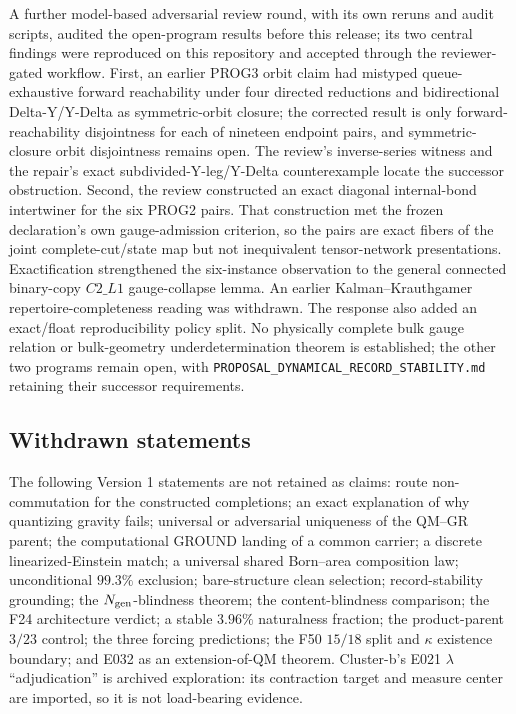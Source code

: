 A further model-based adversarial review round, with its own reruns and audit scripts, audited the open-program results
before this release; its two central findings were reproduced on this repository and accepted through the
reviewer-gated workflow. First, an earlier PROG3 orbit claim had mistyped queue-exhaustive forward reachability under
four directed reductions and bidirectional Delta-Y/Y-Delta as symmetric-orbit closure; the corrected result is only
forward-reachability disjointness for each of nineteen endpoint pairs, and symmetric-closure orbit disjointness remains
open. The review's inverse-series witness and the repair's exact subdivided-Y-leg/Y-Delta counterexample locate the
successor obstruction. Second, the review constructed an exact diagonal internal-bond intertwiner for the six PROG2
pairs. That construction met the frozen declaration's own gauge-admission criterion, so the pairs are exact fibers of the
joint complete-cut/state map but not inequivalent tensor-network presentations. Exactification strengthened the
six-instance observation to the general connected binary-copy \(C2\_L1\) gauge-collapse lemma. An earlier
Kalman--Krauthgamer repertoire-completeness reading was withdrawn. The response also added an exact/float
reproducibility policy split. No physically complete bulk gauge relation or bulk-geometry
underdetermination theorem is established; the other two programs remain open, with
\nolinkurl{PROPOSAL_DYNAMICAL_RECORD_STABILITY.md} retaining their successor requirements.

\subsection{Withdrawn statements}

The following Version 1 statements are not retained as claims: route non-commutation for the constructed completions; an
exact explanation of
why quantizing gravity fails; universal or adversarial uniqueness of the QM--GR parent; the computational GROUND landing
of a common carrier; a discrete linearized-Einstein match; a universal shared Born--area composition law; unconditional
\(99.3\%\) exclusion; bare-structure clean selection; record-stability grounding; the \(N_{\rm gen}\)-blindness theorem;
the content-blindness comparison; the F24 architecture verdict; a stable \(3.96\%\) naturalness fraction; the
product-parent \(3/23\) control; the three forcing predictions; the F50 \(15/18\) split and \(\kappa\) existence boundary;
and E032 as an extension-of-QM theorem. Cluster-b's E021 \(\lambda\) ``adjudication'' is archived exploration: its
contraction target and measure center are imported, so it is not load-bearing evidence.

